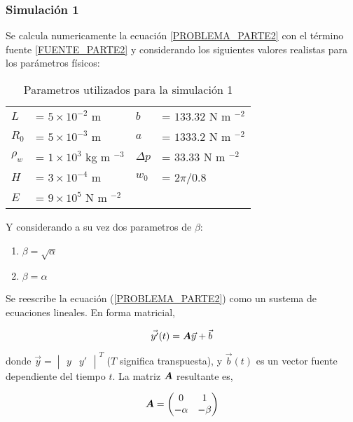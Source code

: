 \subsubsection{Simulación 1}

Se calcula numericamente la ecuación \ref{PROBLEMA_PARTE2} con el término fuente \ref{FUENTE_PARTE2} y considerando los siguientes valores realistas para los parámetros físicos:
\begin{table}
\centering
\begin{tabular}{llll}
$L$		& = $5 \times 10 ^ {-2}$ m 				&	$b$	 		&= $133.32$ N m $^{-2}$ \\
$R_0$	& = $5 \times 10 ^ {-3}$ m 				&	$a$		 	&= $1333.2$ N m $^{-2}$ \\
$\rho_w$& = $1 \times 10 ^ {3}$ kg m $^{-3}$ 	&	$\Delta p$ 	&= $33.33$ N m $^{-2}$ \\
$H$		& = $3 \times 10 ^ {-4}$ m 				&	$w_0$ 		&= $2 \pi / 0.8$ \\
$E$		& = $9 \times 10 ^ {5}$ N m $^{-2}$ 	&				&
\end{tabular}
\caption{Parametros utilizados para la simulación 1} \label{PARAMETROS_PARTE2}
\end{table}

Y considerando a su vez dos parametros de $\beta$:
\begin{enumerate}[label=(\alph*)]
\item $\beta = \sqrt{ \alpha }$ 
\item $\beta = \alpha$
\end{enumerate}

Se reescribe la ecuación (\ref{PROBLEMA_PARTE2}) como un sustema de ecuaciones lineales. En forma matricial,

\begin{equation} \label{PROBLEMA_PARTE2_CORREGIDO}
\vec{y'}(t) = \boldsymbol{A} \vec{y} + \vec{b}
\end{equation}

donde $\vec{y} = \begin{vmatrix} y & y' \end{vmatrix}^T$ ($T$ significa transpuesta), y $\vec{b}(t)$ es un vector fuente dependiente del tiempo $t$. La matriz $\boldsymbol{A}$ resultante es,

\begin{equation}
\boldsymbol{A} = \begin{pmatrix}
0 & 1 \\ -\alpha & -\beta
\end{pmatrix}
\end{equation}


